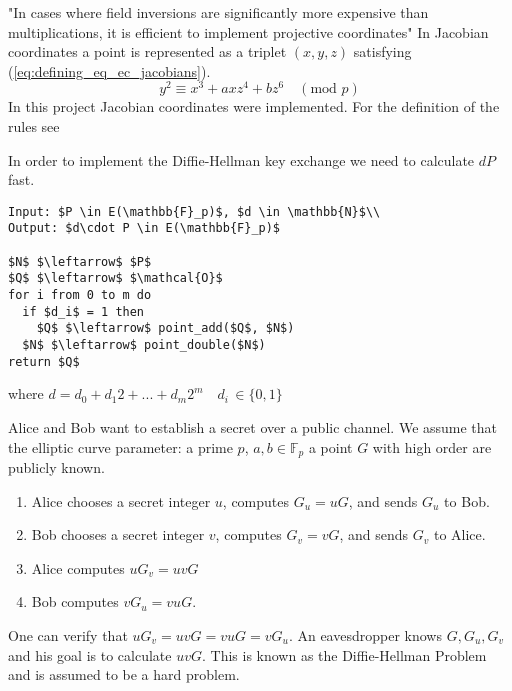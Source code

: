 "In cases where field inversions are significantly more expensive than multiplications, it is efficient to implement projective coordinates" \cite{Blake:1999} In Jacobian coordinates a point is represented as a triplet $(x,y,z)$ satisfying (\ref{eq:defining_eq_ec_jacobians}).
\begin{equation}\label{eq:defining_eq_ec_jacobians}
y^2 \equiv x^3 + axz^4 + bz^6 \quad (\text{mod } p)
\end{equation}
In this project Jacobian coordinates were implemented. For the definition of the rules see \cite[p. 59-60]{Blake:1999}

In order to implement the Diffie-Hellman key exchange we need to calculate $dP$ fast.

\begin{lstlisting}[frame=single, mathescape=true, captionpos=b, caption=double-and-add method]
Input: $P \in E(\mathbb{F}_p)$, $d \in \mathbb{N}$\\
Output: $d\cdot P \in E(\mathbb{F}_p)$

$N$ $\leftarrow$ $P$
$Q$ $\leftarrow$ $\mathcal{O}$
for i from 0 to m do
  if $d_i$ = 1 then
    $Q$ $\leftarrow$ point_add($Q$, $N$)
  $N$ $\leftarrow$ point_double($N$)
return $Q$
\end{lstlisting}
where $d = d_0 + d_1 2 + ... + d_m 2^m \quad d_i \, \in \{0,1\}$

Alice and Bob want to establish a secret over a public channel. We assume that the elliptic curve parameter: a prime $p$, $a, b \in \mathbb{F}_p$ a point $G$ with high order are publicly known.
\begin{enumerate}
\item{Alice chooses a secret integer $u$, computes $G_u = uG$, and sends $G_u$ to Bob.}
\item{Bob chooses a secret integer $v$, computes $G_v = vG$, and sends $G_v$ to Alice.}
\item{Alice computes $uG_v = uvG$}
\item{Bob computes $vG_u = vuG$.}
\end{enumerate}
One can verify that $uG_v = uvG = vuG = v G_u$. An eavesdropper knows $G, G_u, G_v$ and his goal is to calculate $uvG$. This is known as the Diffie-Hellman Problem and is assumed to be a hard problem. 


